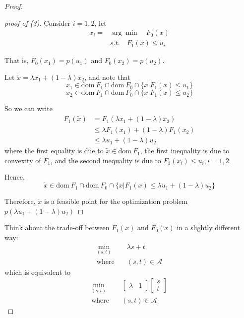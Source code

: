 \begin{proof}
\begin{proof}[proof of (3)]
	Consider $i=1, 2$, let
	\begin{align*}
		x_i = &\arg \min \quad F_0(x)\\
		&s.t. \quad F_1(x) \leq u_i
	\end{align*}
	
	That is, $F_0(x_1) = p(u_1)$ and $F_0(x_2) =p(u_2)$.
	
	Let $\tilde{x} = \lambda x_1 + (1-\lambda)x_2$, and note that
	 $$x_1\in \text{dom}\ F_1\cap \text{dom}\ F_0\cap \{x\vert F_1(x)\leq u_1 \}$$ $$x_2\in \text{dom}\ F_1\cap \text{dom}\ F_0\cap \{x\vert F_1(x)\leq u_2 \}$$
	
	So we can write
	\begin{align*}
		F_1(\tilde{x}) 
		&= F_1(\lambda x_1 + (1-\lambda)x_2)\\
		&\leq \lambda F_1(x_1) + (1-\lambda)F_1(x_2) \\
		&\leq \lambda u_1 + (1-\lambda)u_2
	\end{align*}
	where the first equality is due to $\tilde{x}\in \text{dom}\ F_1$, the first inequality is due to convexity of $F_1$, and the second inequality is due to $F_1(x_i) \leq u_i, i=1, 2.$
	
	Hence, 
	\begin{equation*}
		\tilde{x} \in \text{dom}\ F_1 \cap \text{dom}\ F_0 \cap \{x\vert F_1(x)\leq \lambda u_1 + (1-\lambda)u_2 \}
	\end{equation*}
	
	Therefore, $\tilde{x}$ is a feasible point for the optimization problem $p(\lambda u_1+(1-\lambda)u_2)$	
\end{proof}



Think about the trade-off between $F_1(x)$ and $F_0(x)$ in a slightly different way:
\begin{align*}
	\min_{(s,t)} \quad&\lambda s + t\\
	\text{where} \quad&(s,t) \in \mathcal{A}
\end{align*}
which is equivalent to
\begin{align*}
	\min_{(s,t)} \quad&\begin{bmatrix}
		\lambda &1 
	\end{bmatrix}\begin{bmatrix}
		s\\
		t
	\end{bmatrix}\\
	\text{where} \quad &(s,t) \in \mathcal{A}
\end{align*}


\end{proof}
